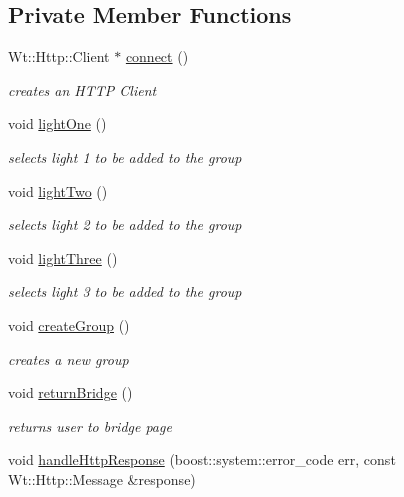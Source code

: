 \subsection*{Private Member Functions}
\begin{DoxyCompactItemize}
\item 
Wt\+::\+Http\+::\+Client $\ast$ \hyperlink{class_groups_control_widget_ac6dc70e7eccf6d30701c15d625424c0c}{connect} ()
\begin{DoxyCompactList}\small\item\em creates an H\+T\+TP Client \end{DoxyCompactList}\item 
void \hyperlink{class_groups_control_widget_a801b235a88f796198f1a65fcbe13c725}{light\+One} ()
\begin{DoxyCompactList}\small\item\em selects light 1 to be added to the group \end{DoxyCompactList}\item 
void \hyperlink{class_groups_control_widget_a28fa2a1848d1358587a37651861be081}{light\+Two} ()
\begin{DoxyCompactList}\small\item\em selects light 2 to be added to the group \end{DoxyCompactList}\item 
void \hyperlink{class_groups_control_widget_aaa514da760a67d4bf3e1ab7e51ea08f0}{light\+Three} ()
\begin{DoxyCompactList}\small\item\em selects light 3 to be added to the group \end{DoxyCompactList}\item 
void \hyperlink{class_groups_control_widget_a891bad4ba589f7bd7be8cb09a0910f20}{create\+Group} ()
\begin{DoxyCompactList}\small\item\em creates a new group \end{DoxyCompactList}\item 
void \hyperlink{class_groups_control_widget_a4fd7d26972133feb20b6941dc191535f}{return\+Bridge} ()
\begin{DoxyCompactList}\small\item\em returns user to bridge page \end{DoxyCompactList}\item 
void \hyperlink{class_groups_control_widget_ad5282b45d7e299bdac0813a8a72f6d3a}{handle\+Http\+Response} (boost\+::system\+::error\+\_\+code err, const Wt\+::\+Http\+::\+Message \&response)

\end{DoxyCompactItemize}
